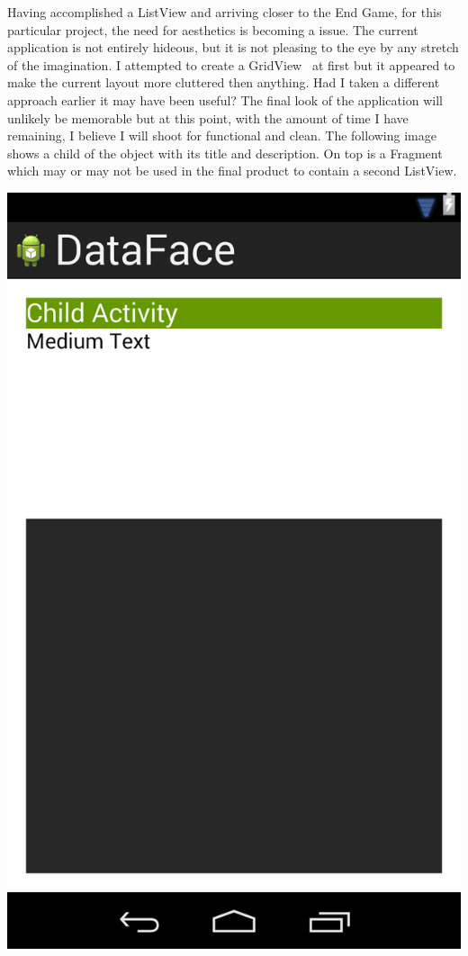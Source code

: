 \documentclass[fontsize=11pt, %
paper=a4, %
twoside, %
captions=tableheading,
index=totoc,
hyperref]{labbook}
\begin{document}
\begin{onehalfspace}
Having accomplished a ListView and arriving closer to the End Game, for this particular project, the need for aesthetics is becoming a issue. The current application is not entirely hideous, but it is not pleasing to the eye by any stretch of the imagination. I attempted to create a GridView~\citep{gridview} at first but it appeared to make the current layout more cluttered then anything. Had I taken a different approach earlier it may have been useful? The final look of the application will unlikely be memorable but at this point, with the amount of time I have remaining, I believe I will shoot for functional and clean. The following image shows a child of the object with its title and description. On top is a Fragment which may or may not be used in the final product to contain a second ListView. 
\end{onehalfspace}
\begin{center}
\includegraphics[scale=0.2]{UI.png}
\end{center}
\end{document}
